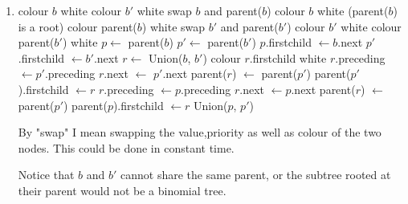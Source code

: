 \documentclass[10pt]{article}
\begin{document}
\begin{enumerate}
	\item
	\begin{comment}
		Suppose you have a linked-list H of binomial trees that satisfies all
		the properties of a black$&$white heap except that it has two black nodes
		$b$ and $b'$ of degree k both of which have parents of degree $k+1$.
		Given pointers to $b$ and $b'$, explain how to transform H in constant
		time into a k'-black$&$white heap with the same set of nodes, for some
		$k' > k$.
	\end{comment}
		
		\begin{algorithmic}[1]
				\State colour $b$ white
				\State colour $b'$ white
			\Else
					\State swap $b$ and parent($b$)
					\State colour $b$ white
					\If(parent($b$) is a root)
						\State colour parent($b$) white
					\EndIf
					\State swap $b'$ and parent($b'$)
					\State colour $b'$ white
						\State colour parent($b'$) white
					\EndIf
				\Else
					\State $p \gets$ parent($b$)
					\State $p' \gets$ parent($b'$)
					\State $p$.firstchild $\gets b$.next
					\State $p'$.firstchild $\gets b'$.next
					\State $r \gets$ Union($b$, $b'$)
					\State colour $r$.firstchild white
						\State $r$.preceding $\gets p'$.preceding
						\State $r$.next $\gets$ $p'$.next
							\State parent($r$) $\gets$ parent($p'$)
								\State parent($p'$).firstchild $\gets r$
							\EndIf
						\EndIf
					\Else
						\State $r$.preceding $\gets p$.preceding
						\State $r$.next $\gets p$.next
							\State parent($r$) $\gets$ parent($p'$)
								parent($p$).firstchild $\gets r$
							\EndIf
						\EndIf
					\EndIf
					\State Union($p$, $p'$)
				\EndIf
			\EndIf
		\end{algorithmic}

		By "swap" I mean swapping the value,priority as well as colour of the
		two nodes. 
		This could be done in constant time.

		Notice that $b$ and $b'$ cannot share the same parent, or the
		subtree rooted at their parent would not be a binomial tree.


\end{enumerate}
\end{document}
